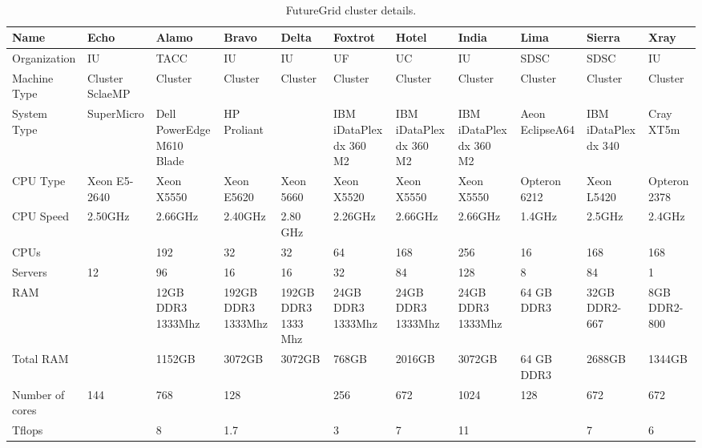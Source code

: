 
\begin{sidewaystable}

\caption{FutureGrid cluster details.}\label{F:cluster-details}
~\\
\begin{footnotesize}
\begin{tabular}{|p{2cm}||p{1.5cm}p{1.5cm}p{1.5cm}p{1.5cm}p{1.5cm}p{1.5cm}p{1.5cm}p{1.5cm}p{1.5cm}p{1cm}|}
\hline
 \bf Name                                & \bf Echo & \bf Alamo & \bf
 Bravo & \bf Delta & \bf Foxtrot & \bf Hotel & \bf India & \bf Lima & \bf Sierra & \bf Xray \\
\hline
\hline
 Organization                        & IU & TACC & IU & IU & UF & UC &
 IU & SDSC & SDSC & IU \\
\hline
 Machine Type                        & Cluster SclaeMP & Cluster &
 Cluster & Cluster & Cluster & Cluster & Cluster & Cluster & Cluster & Cluster \\
\hline
 System Type                         &SuperMicro& Dell PowerEdge M610
 Blade & HP Proliant && IBM iDataPlex dx 360 M2 & IBM iDataPlex dx 360
 M2 & IBM iDataPlex dx 360 M2 & Aeon EclipseA64 & IBM iDataPlex dx 340 & Cray XT5m \\
\hline
 CPU Type                            & Xeon E5-2640 &  Xeon X5550 &
 Xeon E5620 &  Xeon 5660 &  Xeon X5520 &  Xeon X5550 &  Xeon X5550 & Opteron 6212&
 Xeon L5420 & Opteron 2378 \\
\hline
 CPU Speed                           &2.50GHz& 2.66GHz & 2.40GHz &
 2.80 GHz & 2.26GHz & 2.66GHz & 2.66GHz & 1.4GHz & 2.5GHz & 2.4GHz \\
\hline
 CPUs                                &&192&32&32&64&168&256& 16 & 168&168 \\
\hline
 Servers                             &12&96&16&16&32&84&128& 8 & 84&1 \\
\hline
 RAM                                 && 12GB DDR3 1333Mhz & 192GB DDR3
 1333Mhz & 192GB DDR3 1333 Mhz & 24GB DDR3 1333Mhz & 24GB DDR3 1333Mhz
 & 24GB DDR3 1333Mhz & 64 GB DDR3 & 32GB DDR2-667 & 8GB DDR2-800 \\
\hline
 Total RAM
 & &1152GB&3072GB&3072GB&768GB&2016GB&3072GB& 64 GB DDR3& 2688GB&1344GB \\
\hline
 Number of cores                     &144&768&128&&256&672&1024& 128 &672&672 \\
\hline
 Tflops                              &&8&1.7&&3&7&11& &7&6 \\
\hline

\end{tabular}
\end{footnotesize}
\end{sidewaystable}
